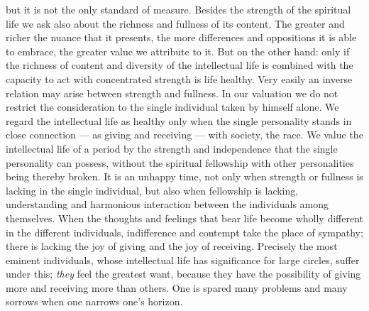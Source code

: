 \documentclass[12pt,a4paper,openany]{book}
\newcommand{\opage}[1]{\marginnote{\footnotesize\textit{[#1]}}}
\begin{document}
but it is not the only standard of measure. Besides the
strength of the spiritual life we ask also about the richness and fullness
of its content. The greater and richer the nuance that it
presents, the more differences and oppositions it is able
to embrace, the greater value we attribute to it. But on the
other hand: only if the richness of content and
diversity of the intellectual life is combined with the capacity to act with concentrated
\opage{228}strength is life healthy. Very easily an inverse
relation may arise between strength and fullness. In our valuation we do not
restrict the consideration to the single individual taken by himself alone.
We regard the intellectual life as healthy only when the single
personality stands in close connection --- as giving and
receiving --- with society, the race. We value the
intellectual life of a period by the strength and independence that the single
personality can possess, without the spiritual fellowship
with other personalities being thereby broken. It is an unhappy
time, not only when strength or fullness is lacking in the single
individual, but also when fellowship is lacking,
understanding and harmonious interaction between the individuals
among themselves. When the thoughts and feelings that bear life become
wholly different in the different individuals, indifference
and contempt take the place of sympathy; there is lacking the joy
of giving and the joy of receiving. Precisely the most
eminent individuals, whose intellectual life has significance for large
circles, suffer under this; \emph{they} feel the greatest want, because they
have the possibility of giving more and receiving more than others.
One is spared many problems and many sorrows when
one narrows one's horizon.
\end{document}
